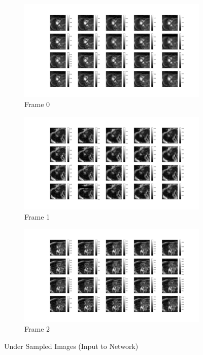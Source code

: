 \documentclass{article}
\begin{document}
\begin{figure}[H]
  \centering
  \begin{subfigure}[b]{0.32\linewidth}
    \includegraphics[width=\linewidth]{../images/No_opt/under_sampling/under_sampling_0.png}
    \caption{Frame 0}
  \end{subfigure}
  \begin{subfigure}[b]{0.32\linewidth}
    \includegraphics[width=\linewidth]{../images/No_opt/under_sampling/under_sampling_1.png}
    \caption{Frame 1}
  \end{subfigure}
  \begin{subfigure}[b]{0.32\linewidth}
    \includegraphics[width=\linewidth]{../images/No_opt/under_sampling/under_sampling_2.png}
    \caption{Frame 2}
  \end{subfigure}
  \caption{Under Sampled Images (Input to Network)}
  \label{fig:under_sampled_no_opt}
\end{figure}
\end{document}
